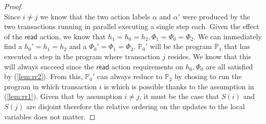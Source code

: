 \begin{proof}
\[\]
Since $i \neq j$ we know that the two action labels $\alpha$ and $\alpha'$ were produced by the two transactions running in parallel executing a single step each. Given the effect of the $\mathsf{read}$ action, we know that $h_1 = h_0 = h_2, \Phi_1 = \Phi_0 = \Phi_2$. We can immediately find a $h_0' = h_1 = h_2$ and a $\Phi_0' = \Phi_1 = \Phi_2$. $\mathds{P}_0'$ will be the program $\mathds{P}_1$ that has executed a step in the program where transaction $j$ resides. We know that this will always succeed since the $\mathsf{read}$ action requirements on $h_0, \Phi_0$ are all satisfied by (\ref{lem:rr2}). From this, $\mathds{P}_0'$ can always reduce to $\mathds{P}_2$ by chosing to run the program in which transaction $i$ is which is possible thanks to the assumption in (\ref{lem:rr1}). Given that by assumption $i \neq j$, it must be the case that $S(i)$ and $S(j)$ are disjoint therefore the relative ordering on the updates to the local variables does not matter.
\end{proof}
\fi

